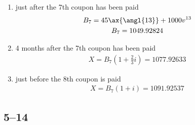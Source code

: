 \documentclass[a4paper, 12pt, reqno]{amsart}
\begin{document}
\begin{enumerate}
    \item just after the 7th coupon has been paid
        \begin{equation}\nonumber
            \begin{gathered}
                B_7 = 45 \ax{\angl{13}} + 1000 v^{13} \\
                B_7 = 1049.92824
            \end{gathered}
        \end{equation}
    \item 4 months after the 7th coupon has been paid
        \begin{equation}\nonumber
            \begin{gathered}
                X = B_7 (1 + \frac{2}{3}i) = 1077.92633
            \end{gathered}
        \end{equation}
    \item just before the 8th coupon is paid
        \begin{equation}\nonumber
            \begin{gathered}
                X = B_7 (1 + i) = 1091.92537
            \end{gathered}
        \end{equation}
\end{enumerate}

\subsection*{5--14}
\end{document}
